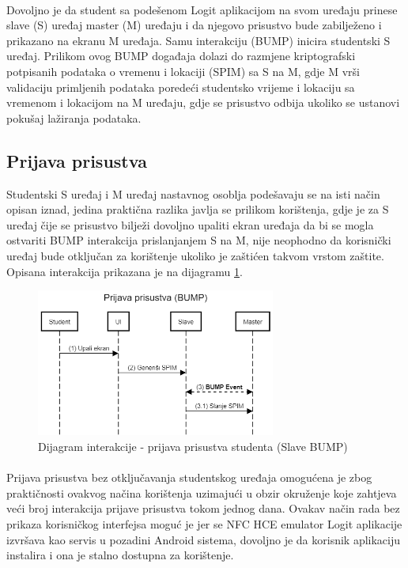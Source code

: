 \paragraph*{}
Dovoljno je da student sa podešenom Logit aplikacijom na svom uređaju prinese slave (S) uređaj master (M) uređaju i da njegovo prisustvo bude zabilježeno i prikazano na ekranu M uređaja. Samu interakciju (BUMP) inicira studentski S uređaj. Prilikom ovog BUMP događaja dolazi do razmjene kriptografski potpisanih podataka o vremenu i lokaciji (SPIM) sa S na M, gdje M vrši validaciju primljenih podataka poredeći studentsko vrijeme i lokaciju sa vremenom i lokacijom na M uređaju, gdje se prisustvo odbija ukoliko se ustanovi pokušaj lažiranja podataka.

\subsection*{Prijava prisustva}
Studentski S uređaj i M uređaj nastavnog osoblja podešavaju se na isti način opisan iznad, jedina praktična razlika javlja se prilikom korištenja, gdje je za S uređaj čije se prisustvo bilježi dovoljno upaliti ekran uređaja da bi se mogla ostvariti BUMP interakcija prislanjanjem S na M, nije neophodno da korisnički uređaj bude otključan za korištenje ukoliko je zaštićen takvom vrstom zaštite. Opisana interakcija prikazana je na dijagramu \ref{fig:int_dia_sbump}.

\begin{figure}[H]
    \centering
    \includegraphics[width=0.7\textwidth]{material/dia/03_prijava}
    \caption{Dijagram interakcije - prijava prisustva studenta (Slave BUMP)}
    \label{fig:int_dia_sbump}
\end{figure}

\paragraph*{}
Prijava prisustva bez otključavanja studentskog uređaja omogućena je zbog praktičnosti ovakvog načina korištenja uzimajući u obzir okruženje koje zahtjeva veći broj interakcija prijave prisustva tokom jednog dana. Ovakav način rada bez prikaza korisničkog interfejsa moguć je jer se NFC HCE emulator Logit aplikacije izvršava kao servis u pozadini Android sistema, dovoljno je da korisnik aplikaciju instalira i ona je stalno dostupna za korištenje.

